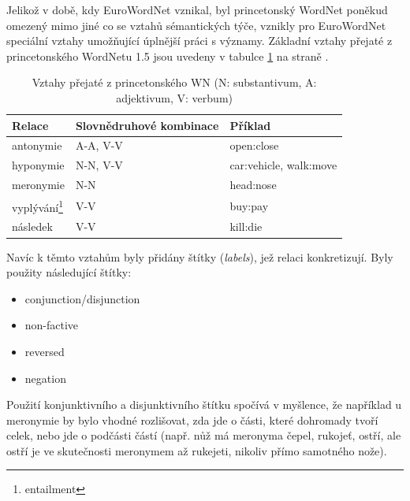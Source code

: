 \documentclass[a4paper, 11pt, oneside]{book}
\newcommand\ex{\textsf}
\begin{document}
				Jelikož v době, kdy EuroWordNet vznikal, byl princetonský WordNet poněkud omezený mimo jiné co se vztahů sémantických týče, vznikly pro EuroWordNet speciální vztahy umožňující úplnější práci s významy. Základní vztahy přejaté z princetonského WordNetu 1.5 jsou uvedeny v tabulce \ref{tab:wn-rels} na straně \pageref{tab:wn-rels}.

				\begin{table}[t]
					\centering
					\label{tab:wn-rels}
					\begin{tabular}{l l l}
					Relace                           & Slovnědruhové kombinace & Příklad                          \\\hline
					antonymie                        & A-A, V-V                & \ex{open:close}                  \\\hline
					hyponymie                        & N-N, V-V                & \ex{car:vehicle}, \ex{walk:move} \\\hline
					meronymie                        & N-N                     & \ex{head:nose}                   \\\hline
					vyplývání\footnote{entailment}   & V-V                     & \ex{buy:pay}                     \\\hline
					následek                         & V-V                     & \ex{kill:die}               
					\end{tabular}
					\caption{Vztahy přejaté z princetonského WN (N: substantivum, A: adjektivum, V: verbum)}
				\end{table}

				Navíc k těmto vztahům byly přidány štítky (\textit{labels}), jež relaci konkretizují. Byly použity následující štítky:

				\begin{itemize}
					\item conjunction/disjunction
					\item non-factive
					\item reversed
					\item negation
				\end{itemize}

				Použití konjunktivního a disjunktivního štítku spočívá v myšlence, že například u meronymie by bylo vhodné rozlišovat, zda jde o části, které dohromady tvoří celek, nebo jde o podčásti částí (např. \ex{nůž} má meronyma \ex{čepel}, \ex{rukojeť}, \ex{ostří}, ale \ex{ostří} je ve skutečnosti meronymem až \ex{rukejeti}, nikoliv přímo samotného \ex{nože}).
\end{document}
